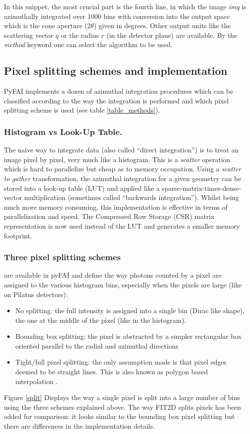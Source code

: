 \documentclass{iucr}
\begin{document}
In this snippet, the most crucial part is the fourth line, in which the image
\textit{img} is azimuthally integrated over 1000 bins with conversion  into
the output space which is the cone aperture ($2\theta$) given in degrees.
Other output units like the scattering vector $q$ or the radius $r$ (in the
detector plane) are available. By the \textit{method} keyword one can select the
algorithm to be used.

\subsection{Pixel splitting schemes and implementation}

PyFAI implements a dozen of azimuthal integration procedures which can be
classified according to the way the integration is performed and which pixel
splitting scheme is used (see table \ref{table_methods}).

\subsubsection{Histogram vs Look-Up Table.}
The naive way to integrate data (also called ``direct integration'') is to treat
an image pixel by pixel, very much like a histogram.
This is a \textit{scatter} operation which is hard to parallelize but cheap as
to memory occupation.
Using a \textit{scatter to gather} transformation, the azimuthal integration for
a given geometry can be stored into a look-up table (LUT) and applied like a
sparse-matrix-times-dense-vector multiplication (sometimes called
``backwards integration'').
Whilst being much more memory consuming, this
implementation is effective in terms of parallelization and speed.
The Compressed Row Storage (CSR) matrix representation is now used instead of
the LUT and generates a smaller memory footprint.

\subsubsection{Three pixel splitting schemes} are available in pyFAI and define
the way photons counted by a pixel are assigned to the various histogram bins,
especially when the pixels are large (like on Pilatus detectors):
\begin{itemize}
\item No splitting: the full intensity is assigned into a single bin (Dirac
like shape), the one at the middle of the pixel (like in the histogram).
\item Bounding box splitting: the pixel is abstracted by a simpler rectangular box
oriented parallel to the radial and azimuthal directions
\item
Tight/full pixel splitting: the only assumption made is that pixel
edges deemed to be straight lines. This is also known as polygon based
interpolation \cite{stefanvdw}.
\end{itemize}
Figure \ref{split} Displays the way a single pixel is split into a
large number of bins using the three schemes explained above.
The way FIT2D splits pixels has been added for comparison: it looks
similar to the bounding box pixel splitting but there are differences
in the implementation details.
\end{document}
